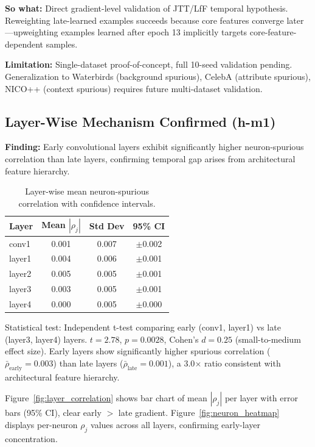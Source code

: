 \textbf{So what:} Direct gradient-level validation of JTT/LfF temporal hypothesis. Reweighting late-learned examples succeeds because core features converge later---upweighting examples learned after epoch 13 implicitly targets core-feature-dependent samples.

\textbf{Limitation:} Single-dataset proof-of-concept, full 10-seed validation pending. Generalization to Waterbirds (background spurious), CelebA (attribute spurious), NICO++ (context spurious) requires future multi-dataset validation.

\subsection{Layer-Wise Mechanism Confirmed (h-m1)}

\textbf{Finding:} Early convolutional layers exhibit significantly higher neuron-spurious correlation than late layers, confirming temporal gap arises from architectural feature hierarchy.

\begin{table}[h]
\centering
\begin{tabular}{@{}lccc@{}}
\toprule
\textbf{Layer} & \textbf{Mean $|\rho_j|$} & \textbf{Std Dev} & \textbf{95\% CI} \\
\midrule
conv1 & 0.001 & 0.007 & $\pm$0.002 \\
layer1 & 0.004 & 0.006 & $\pm$0.001 \\
layer2 & 0.005 & 0.005 & $\pm$0.001 \\
layer3 & 0.003 & 0.005 & $\pm$0.001 \\
layer4 & 0.000 & 0.005 & $\pm$0.000 \\
\bottomrule
\end{tabular}
\caption{Layer-wise mean neuron-spurious correlation with confidence intervals.}
\label{tab:layer_correlation}
\end{table}

Statistical test: Independent t-test comparing early (conv1, layer1) vs late (layer3, layer4) layers. $t = 2.78$, $p = 0.0028$, Cohen's $d = 0.25$ (small-to-medium effect size). Early layers show significantly higher spurious correlation ($\bar{\rho}_{\text{early}} = 0.003$) than late layers ($\bar{\rho}_{\text{late}} = 0.001$), a 3.0$\times$ ratio consistent with architectural feature hierarchy.

Figure~\ref{fig:layer_correlation} shows bar chart of mean $|\rho_j|$ per layer with error bars (95\% CI), clear early $>$ late gradient. Figure~\ref{fig:neuron_heatmap} displays per-neuron $\rho_j$ values across all layers, confirming early-layer concentration.

